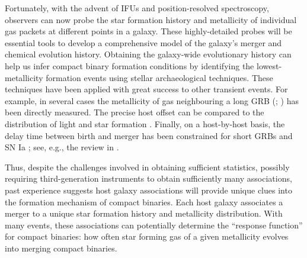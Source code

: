 \documentclass[a4paper,fleqn,usenatbib]{mnras}
\newcommand\editremark[1]{{\color{red}#1}}
\newcommand\jillianremark[1]{{\color{blue}#1}}
\begin{document}
%
Fortunately,  with the advent of
IFUs and position-resolved spectroscopy, observers can now probe the star formation history and metallicity of individual gas packets at different points in a galaxy.  
These highly-detailed probes will be essential tools to develop a comprehensive model of the galaxy's merger and
chemical evolution history.    Obtaining the galaxy-wide evolutionary history can help us infer compact binary formation
conditions by identifying the lowest-metallicity formation events using stellar archaeological techniques.  
These techniques have been applied with great success to other transient events. 
For example, in several cases the metallicity of gas neighbouring a long GRB (\citet{ 2008AJ....135.1136M};
\citet{2010AJ....140.1557L}) has been directly measured.  %
%
The precise host offset can be compared to the distribution of light and star formation  \citep{2010ApJ...708....9F}.
%
Finally,  on a host-by-host basis, the delay time between birth and merger has been constrained for
short GRBs \citep{2010ApJ...725.1202L}
 and
  SN Ia \citep{2011MNRAS.412.1508M}; see, e.g., the review in  \cite{2014ARAA..52...43B}. 

  

%


Thus, despite the challenges involved in obtaining sufficient statistics, possibly requiring third-generation instruments to
obtain sufficiently many associations, past experience suggests  host galaxy associations
will provide unique clues into the formation mechanism of compact binaries.
% 
Each host galaxy associates a merger to a unique star formation history and metallicity distribution.
With many events, these associations can potentially determine the ``response function'' for compact binaries: how often star forming gas of a given metallicity evolves into
merging compact binaries.    
%
%
\end{document}
